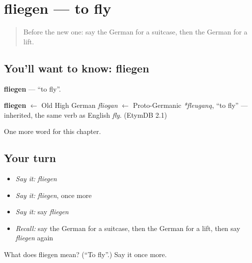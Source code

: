 \section[fliegen]{fliegen — to fly}

\label{lesson:GE-C111-fliegen}



\begin{quote}
Before the new one: say the German for a suitcase, then the German for a lift.
\end{quote}

\subsection*{You'll want to know: fliegen}
\textbf{fliegen} — \textquotedblleft{}to fly\textquotedblright{}.

\begin{cousinweb}
\textbf{fliegen} $\leftarrow$ Old High German \emph{fliogan} $\leftarrow$ Proto-Germanic \emph{*fleuganą}, \textquotedblleft{}to fly\textquotedblright{} — inherited, the same verb as English \emph{fly}. (EtymDB 2.1)
\end{cousinweb}

\begin{grammarlens}[title={What you've built}]
One more word for this chapter.
\end{grammarlens}

\subsection*{Your turn}
\begin{itemize}
\raggedright
  \item \emph{Say it:} \emph{fliegen}
  \item \emph{Say it:} \emph{fliegen}, once more
  \item \emph{Say it:} say \emph{fliegen}
  \item \emph{Recall:} say the German for a suitcase, then the German for a lift, then say \emph{fliegen} again
\end{itemize}

\begin{tcolorbox}[breakable,colback=teal!4,colframe=teal!35!black,title={Before you move on}]
What does fliegen mean? (\textquotedblleft{}To fly\textquotedblright{}.) Say it once more.
\end{tcolorbox}

